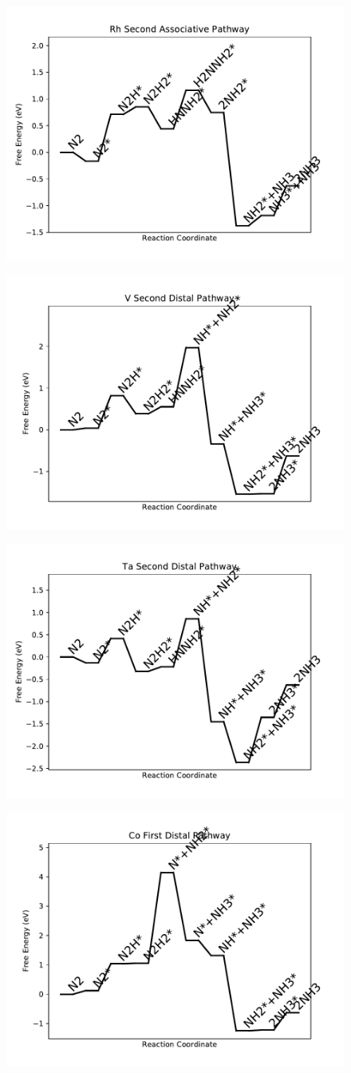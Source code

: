 \documentclass[journal=jacsat,manuscript=article]{achemso}
\begin{document}
\begin{figure}
\includegraphics[width=0.5\linewidth]{data/plots/Rh_associative_2.pdf}
\label{fig:Rh_associative_2}
\end{figure}

\begin{figure}
\includegraphics[width=0.5\linewidth]{data/plots/V_distal_2.pdf}
\label{fig:V_distal_2}
\end{figure}

\begin{figure}
\includegraphics[width=0.5\linewidth]{data/plots/Ta_distal_2.pdf}
\label{fig:Ta_distal_2}
\end{figure}

\begin{figure}
\includegraphics[width=0.5\linewidth]{data/plots/Co_distal_1.pdf}
\label{fig:Co_distal_1}
\end{figure}
\end{document}
